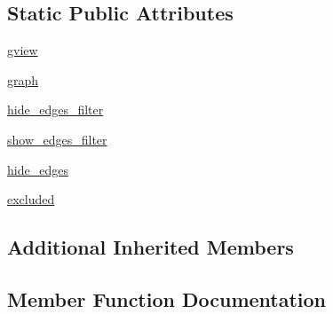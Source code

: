 \subsection*{Static Public Attributes}
\begin{DoxyCompactItemize}
\item 
\hyperlink{classnetworkx_1_1classes_1_1tests_1_1test__subgraphviews_1_1TestMultiDiGraphView_a93ce6e5742b1a8ee86fa1dc18f79d253}{gview}
\item 
\hyperlink{classnetworkx_1_1classes_1_1tests_1_1test__subgraphviews_1_1TestMultiDiGraphView_ac38a22e45929675983f8442fc561d7be}{graph}
\item 
\hyperlink{classnetworkx_1_1classes_1_1tests_1_1test__subgraphviews_1_1TestMultiDiGraphView_ae0710d36fe96fda989ff4f602e14a6c2}{hide\+\_\+edges\+\_\+filter}
\item 
\hyperlink{classnetworkx_1_1classes_1_1tests_1_1test__subgraphviews_1_1TestMultiDiGraphView_a9001caef3d99d49b2f1b62647c92121e}{show\+\_\+edges\+\_\+filter}
\item 
\hyperlink{classnetworkx_1_1classes_1_1tests_1_1test__subgraphviews_1_1TestMultiDiGraphView_a425ba95f742102f85c5aac72483e4bd9}{hide\+\_\+edges}
\item 
\hyperlink{classnetworkx_1_1classes_1_1tests_1_1test__subgraphviews_1_1TestMultiDiGraphView_a23a8731db9d565aa50c14cab84331f92}{excluded}
\end{DoxyCompactItemize}
\subsection*{Additional Inherited Members}


\subsection{Member Function Documentation}
\mbox{\label{classnetworkx_1_1classes_1_1tests_1_1test__subgraphviews_1_1TestMultiDiGraphView_a7188f1e7e2b7afb75d7035ad82db25bc}} 
